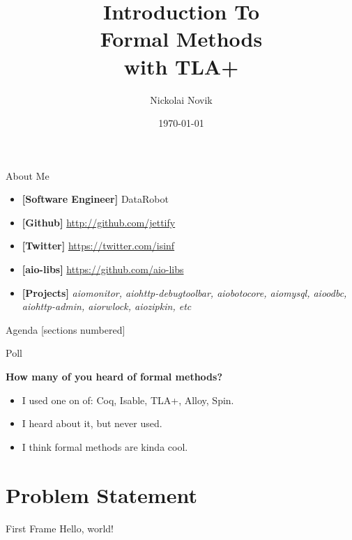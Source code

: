 \documentclass[12pt]{beamer}
\title{Introduction To \\ Formal Methods \\ with TLA+}
\date{\today}
\author{Nickolai Novik}
\institute{\href{http://github.com/jettify}{http://github.com/jettify}}
\begin{document}
  \maketitle
  \begin{frame}{About Me}
    \begin{itemize}
        \item \textbf{[Software Engineer]}  DataRobot
        \item \textbf{[Github]}
            \href{http://github.com/jettify}{http://github.com/jettify}
        \item \textbf{[Twitter]}
            \href{https://twitter.com/isinf}{https://twitter.com/isinf}
        \item \textbf{[aio-libs]}
            \href{https://github.com/aio-libs}{https://github.com/aio-libs}
        \item \textbf{[Projects]}
            \textit{aiomonitor, aiohttp-debugtoolbar,
          aiobotocore, aiomysql, aioodbc, aiohttp-admin, aiorwlock,
          aiozipkin, etc}
    \end{itemize}
  \end{frame}
  \begin{frame}[squeeze]{Agenda}
      [sections numbered]
      \tableofcontents
  \end{frame}
  \begin{frame}{Poll}
      \begin{large}
          \textbf{How many of you heard of formal methods?}
      \end{large}
    \begin{itemize}
      \item I used one on of: Coq, Isable, TLA+, Alloy, Spin.
      \item I heard about it, but never used.
      \item I think formal methods are kinda cool.
    \end{itemize}
  \end{frame}
  \section{Problem Statement}
  \begin{frame}{First Frame}
    Hello, world!
  \end{frame}
\end{document}
